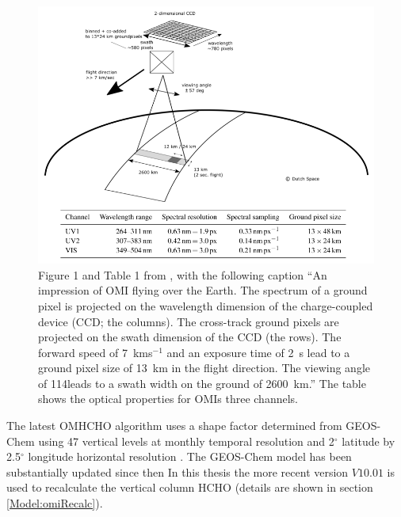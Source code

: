   
  \begin{figure}
    \includegraphics[width=\textwidth]{Figures/Shenkeveld_OMI_summary.png}
    \caption{ %
      Figure 1 and Table 1 from \textcite{Schenkeveld2017}, with the following caption ``An impression of OMI flying over the Earth.
      The spectrum of a ground pixel is projected on the wavelength dimension of the charge-coupled device (CCD; the columns). 
      The cross-track ground pixels are projected on the swath dimension of the CCD (the rows).
      The forward speed of 7~kms$^{-1}$ and an exposure time of 2~s lead to a ground pixel size of 13~km in the flight direction.
      The viewing angle of 114\degr leads to a swath width on the ground of 2600~km.''
      The table shows the optical properties for OMIs three channels.}
    \label{LR:HCHO:Sat:fig_Shenkeveld_OMI_summary}
  \end{figure}
  
  The latest OMHCHO algorithm uses a shape factor determined from GEOS-Chem using 47 vertical levels at monthly temporal resolution and 2$^{\circ}$ latitude by 2.5$^{\circ}$ longitude horizontal resolution \parencite{Abad2015}.
  The GEOS-Chem model has been substantially updated since then
  In this thesis the more recent version $V10.01$ is used to recalculate the vertical column HCHO (details are shown in section \ref{Model:omiRecalc}).
  
